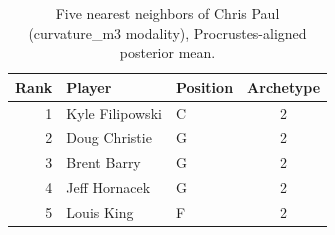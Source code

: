 \begin{table}[htbp]
  \centering\small
  \begin{tabular}{rllc}
    \toprule
    Rank & Player & Position & Archetype \\
    \midrule
    1 & Kyle Filipowski & C & 2 \\
    2 & Doug Christie & G & 2 \\
    3 & Brent Barry & G & 2 \\
    4 & Jeff Hornacek & G & 2 \\
    5 & Louis King & F & 2 \\
    \bottomrule
  \end{tabular}
  \caption{Five nearest neighbors of Chris Paul (curvature_m3 modality), Procrustes-aligned posterior mean.}
  \label{tab:Chris_Paul_neighbors_curvature_m3}
\end{table}

